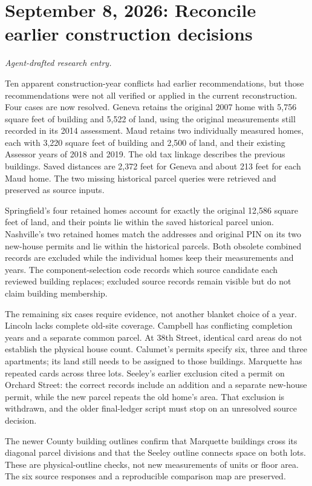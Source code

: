 \clearpage
\section*{September 8, 2026: Reconcile earlier construction decisions}
\textit{Agent-drafted research entry.}

Ten apparent construction-year conflicts had earlier recommendations, but those
recommendations were not all verified or applied in the current reconstruction.
Four cases are now resolved. Geneva retains the original 2007 home with 5,756 square
feet of building and 5,522 of land, using the original measurements still recorded in its 2014 assessment.
Maud retains two individually measured homes, each with 3,220 square feet of building
and 2,500 of land, and their existing Assessor years of 2018 and 2019. The old tax
linkage describes the previous buildings. Saved distances are 2,372 feet for Geneva
and about 213 feet for each Maud home. The two missing historical parcel queries
were retrieved and preserved as source inputs.

Springfield's four retained homes account for exactly the original 12,586 square
feet of land, and their points lie within the saved historical parcel union.
Nashville's two retained homes match the addresses and original PIN on its two
new-house permits and lie within the historical parcels. Both obsolete combined
records are excluded while the individual homes keep their measurements and years.
The component-selection code records which source candidate each reviewed building
replaces; excluded source records remain visible but do not claim building membership.

The remaining six cases require evidence, not another blanket choice of a year.
Lincoln lacks complete old-site coverage. Campbell has conflicting completion years
and a separate common parcel. At 38th Street, identical card areas do not establish
the physical house count. Calumet's permits specify six, three and three apartments;
its land still needs to be assigned to those buildings. Marquette has repeated cards
across three lots. Seeley's earlier exclusion cited a permit on Orchard Street:
the correct records include an addition and a separate new-house permit, while the
new parcel repeats the old home's area. That exclusion is withdrawn, and the older
final-ledger script must stop on an unresolved source decision.

The newer County building outlines confirm that Marquette buildings cross its
diagonal parcel divisions and that the Seeley outline connects space on both lots.
These are physical-outline checks, not new measurements of units or floor area.
The six source responses and a reproducible comparison map are preserved.

